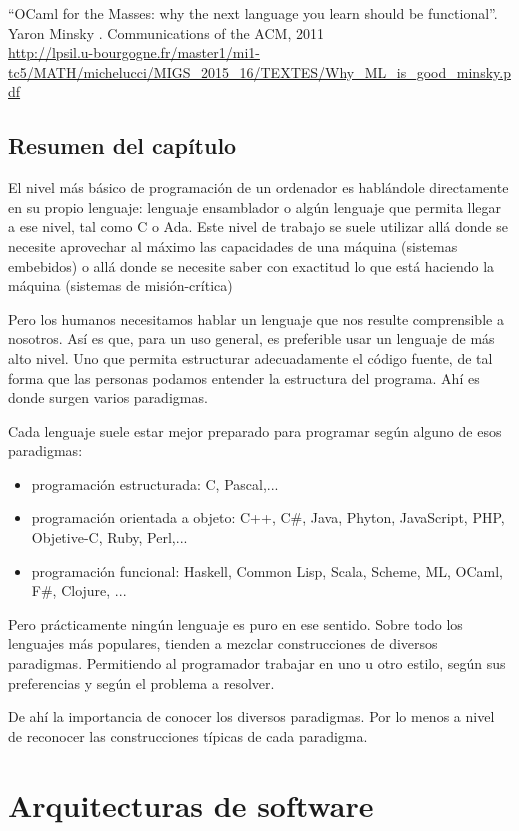 \documentclass[spanish,12pt,a4paper,final,oneside]{book}
\begin{document}
``OCaml for the Masses: why the next language you learn should be functional''. Yaron Minsky . Communications of the ACM, 2011
\\ \url{http://lpsil.u-bourgogne.fr/master1/mi1-tc5/MATH/michelucci/MIGS_2015_16/TEXTES/Why_ML_is_good_minsky.pdf}


\section*{Resumen del capítulo}
El nivel más básico de programación de un ordenador es hablándole directamente en su propio lenguaje: lenguaje ensamblador o algún lenguaje que permita llegar a ese nivel, tal como C o Ada. Este nivel de trabajo se suele utilizar allá donde se necesite aprovechar al máximo las capacidades de una máquina (sistemas embebidos) o allá donde se necesite saber con exactitud lo que está haciendo la máquina (sistemas de misión-crítica)

Pero los humanos necesitamos hablar un lenguaje que nos resulte comprensible a nosotros. Así es que, para un uso general, es preferible usar un lenguaje de más alto nivel. Uno que permita estructurar adecuadamente el código fuente, de tal forma que las personas podamos entender la estructura del programa. Ahí es donde surgen varios paradigmas.

Cada lenguaje suele estar mejor preparado para programar según alguno de esos paradigmas:
\begin{itemize}
\item programación estructurada: C, Pascal,...
\item programación orientada a objeto: C++, C\#, Java, Phyton, JavaScript, PHP, Objetive-C, Ruby, Perl,...
\item programación funcional: Haskell, Common Lisp, Scala, Scheme, ML, OCaml, F\#, Clojure, ... 
\end{itemize}

Pero prácticamente ningún lenguaje es puro en ese sentido. Sobre todo los lenguajes más populares, tienden a mezclar construcciones de diversos paradigmas. Permitiendo al programador trabajar en uno u otro estilo, según sus preferencias y según el problema a resolver.

De ahí la importancia de conocer los diversos paradigmas. Por lo menos a nivel de reconocer las construcciones típicas de cada paradigma.


\chapter{Arquitecturas de software}
\end{document}
